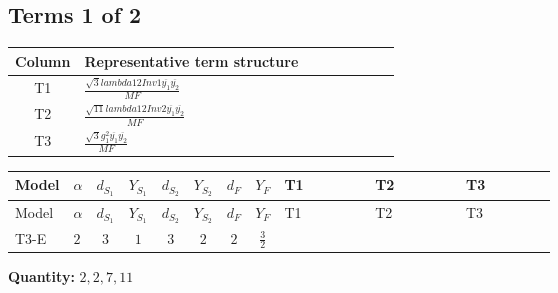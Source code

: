 \documentclass[8pt]{article}
\begin{document}
\begin{landscape}
\subsection*{Terms 1 of 2}
\begin{center}
\begin{tabular}{@{}c >{\raggedright\arraybackslash}p{0.82\linewidth}@{}}
\toprule
Column & Representative term structure \\
\midrule
T1 & \(\displaystyle \frac{\sqrt{3} lambda12Inv1 \overline{y_{1}} \overline{y_{2}}}{MF}\) \\
\midrule
T2 & \(\displaystyle \frac{\sqrt{11} lambda12Inv2 \overline{y_{1}} \overline{y_{2}}}{MF}\) \\
\midrule
T3 & \(\displaystyle \frac{\sqrt{3} g_{1}^{2} \overline{y_{1}} \overline{y_{2}}}{MF}\) \\
\midrule
\bottomrule
\end{tabular}
\end{center}
\smallskip
\tiny
\begin{longtable}{@{}llcccccc >{\raggedright\arraybackslash}p{0.21\linewidth} >{\raggedright\arraybackslash}p{0.21\linewidth} >{\raggedright\arraybackslash}p{0.21\linewidth}@{}}
\toprule
Model & $\alpha$ & $d_{S_1}$ & $Y_{S_1}$ & $d_{S_2}$ & $Y_{S_2}$ & $d_F$ & $Y_F$ & T1 & T2 & T3 \\
\midrule
\endfirsthead
\toprule
Model & $\alpha$ & $d_{S_1}$ & $Y_{S_1}$ & $d_{S_2}$ & $Y_{S_2}$ & $d_F$ & $Y_F$ & T1 & T2 & T3 \\
\midrule
\endhead
T3-E & $2$ & $3$ & $1$ & $3$ & $2$ & $2$ & $\frac{3}{2}$ & \scriptsize\adjustbox{max width=\linewidth}{$\begin{gathered} - \frac{\sqrt{3} lambda12Inv1 \overline{y_{1}} \overline{y_{2}}}{6 MF}\end{gathered}$} & \scriptsize\adjustbox{max width=\linewidth}{$\begin{gathered} \frac{3 \sqrt{11} lambda12Inv2 \overline{y_{1}} \overline{y_{2}}}{22 MF}\end{gathered}$} & \scriptsize\adjustbox{max width=\linewidth}{$\begin{gathered} \frac{9 \sqrt{3} g_{1}^{2} \overline{y_{1}} \overline{y_{2}}}{8 MF}\end{gathered}$} \\
\midrule
\bottomrule
\end{longtable}
\clearpage
\noindent\textbf{Quantity: }$\mathrm{2,2,7,11}$\par\smallskip

\end{landscape}
\end{document}
